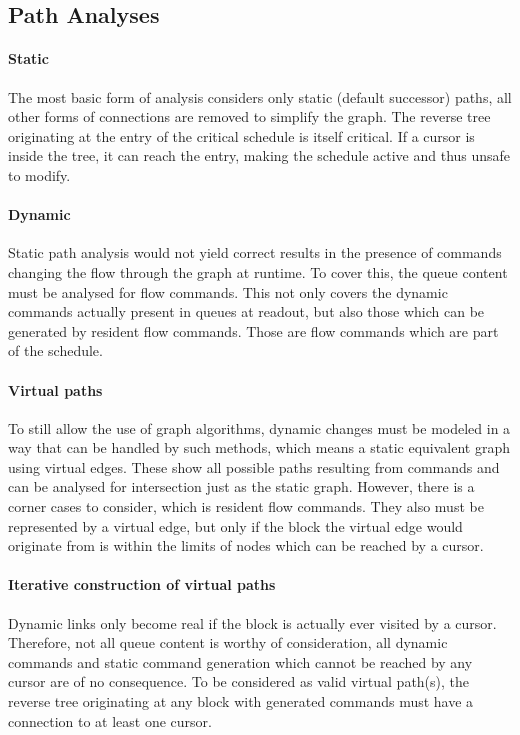 \subsection{Path Analyses}
\label{ssec:path}
\paragraph{Static}
The most basic form of analysis considers only static (default successor) paths, all other forms of connections are removed to simplify the graph. The reverse tree originating at the entry of the critical schedule is itself critical. If a cursor is inside the tree, it can reach the entry, making the schedule active and thus unsafe to modify.

\paragraph{Dynamic}
Static path analysis would not yield correct results in the presence of commands changing the flow through the graph at runtime. To cover this, the queue content must be analysed for flow commands. This not only covers the dynamic commands actually present in queues at readout, but also those which can be generated by resident flow commands. Those are flow commands which are part of the schedule.

\paragraph{Virtual paths}
To still allow the use of graph algorithms, dynamic changes must be modeled in a way that can be handled by such methods, which means a static equivalent graph using virtual edges.
These show all possible paths resulting from commands and can be analysed for intersection just as the static graph. However, there is a corner cases to consider, which is resident flow commands.
 They also must be represented by a virtual edge, but only if the block the virtual edge would originate from is within the limits of nodes which can be reached by
a cursor.

\paragraph{Iterative construction of virtual paths}
Dynamic links only become real if the block is actually ever visited by a cursor. Therefore, not all queue content is worthy of consideration, all dynamic commands and static command generation which cannot be reached by any cursor are of no consequence. To be considered as valid virtual path(s), the reverse tree originating at any block with generated commands must have a connection to at least one cursor.


